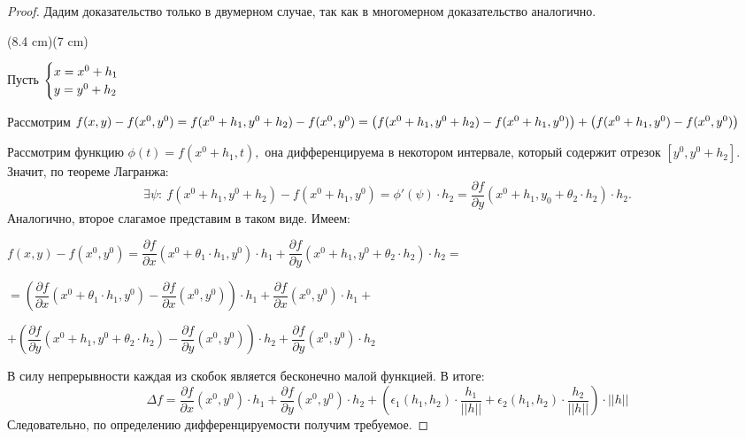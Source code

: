 \begin{proof}
    Дадим доказательство только в двумерном случае, так как в многомерном доказательство аналогично.
    
    \sidefig(8.4 cm)(7 cm)
    {
    \begin{flushleft}
    \normalsize Пусть
        $
            \begin{cases}
                x = x^{0} + h_{1}\\
                y = y^{0} + h_{2}
            \end{cases}\hfill\newline
        $
        
        \normalsize Рассмотрим
        $f(x, y) - f(x^0, y^0) = f(x^0 + h_1, y^0 + h_2) - f(x^0, y^0) = \left( f(x^0 + h_1, y^0 + h_2) - f(x^0 + h_1, y^0) \right) + \left( f(x^0 + h_1, y^0) - f(x^0, y^0) \right)\newline$
    \end{flushleft}
    }
    {
    
    }

    Рассмотрим функцию $\phi(t) = f(x^0 + h_1, t),$ она дифференцируема в некотором интервале, который содержит отрезок $[y^0, y^0 + h_2].$ Значит, по теореме Лагранжа:
    $$\exists \psi: \ f(x^0 + h_1, y^0 + h_2) - f(x^0 + h_1, y^0) = \phi'(\psi) \cdot h_2 = \dfrac{\partial f}{\partial y} (x^0 + h_1, y_0 + \theta_2 \cdot h_2) \cdot h_2.$$
    Аналогично, второе слагамое представим в таком виде. Имеем:
    
    $f(x, y) - f(x^0, y^0) = \dfrac{\partial f}{\partial x} (x^0 + \theta_1 \cdot h_1, y^0) \cdot h_1 + \dfrac{\partial f}{\partial y} (x^0 + h_1, y^0 + \theta_2 \cdot h_2) \cdot h_2 = $
    
    $ = \left( \dfrac{\partial f}{\partial x} (x^0 + \theta_1 \cdot h_1, y^0) - \dfrac{\partial f}{\partial x} (x^0, y^0) \right) \cdot h_1 + \dfrac{\partial f}{\partial x} (x^0, y^0) \cdot h_1 +  $
    \begin{flushright}
            $+ \left( \dfrac{\partial f}{\partial y} (x^0 + h_1, y^0 + \theta_2 \cdot h_2) - \dfrac{\partial f}{\partial y} (x^0, y^0)\right) \cdot h_2 + \dfrac{\partial f}{\partial y} (x^0, y^0) \cdot h_2$
    \end{flushright}


    В силу непрерывности каждая из скобок является бесконечно малой функцией. В итоге:
    $$\Delta f = \dfrac{\partial f}{\partial x} (x^0, y^0) \cdot h_1 + \dfrac{\partial f}{\partial y} (x^0, y^0) \cdot h_2 + \left( \epsilon_1(h_1, h_2) \cdot \frac{h_1}{||h||} + \epsilon_2(h_1,h_2) \cdot \frac{h_2}{||h||}\right) \cdot ||h||$$
    Следовательно, по определению дифференцируемости получим требуемое.
\end{proof}

